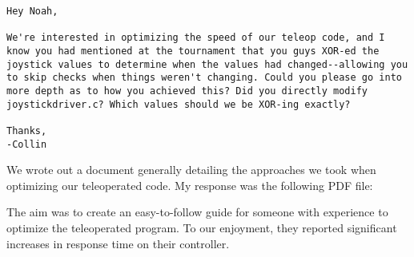 \begin{lstlisting}
Hey Noah,

We're interested in optimizing the speed of our teleop code, and I know you had mentioned at the tournament that you guys XOR-ed the joystick values to determine when the values had changed--allowing you to skip checks when things weren't changing. Could you please go into more depth as to how you achieved this? Did you directly modify joystickdriver.c? Which values should we be XOR-ing exactly?

Thanks,
-Collin 
\end{lstlisting}

We wrote out a document generally detailing the approaches we took when optimizing our teleoperated code. My response was the following PDF file:



The aim was to create an easy-to-follow guide for someone with experience to optimize the teleoperated program. To our enjoyment, they reported significant increases in response time on their controller.